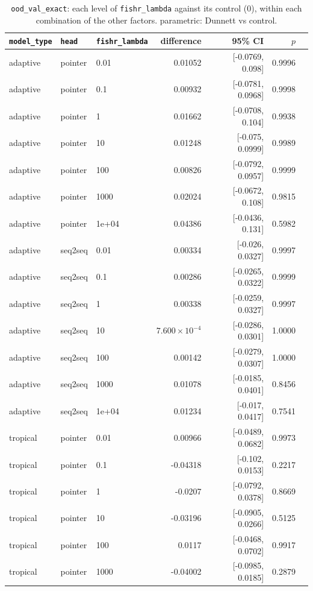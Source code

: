 \documentclass[10pt]{article}
\begin{document}
{\small
\begin{longtable}{lllrrrl}
\caption{\texttt{ood\_val\_exact}: each level of \texttt{fishr\_lambda} against its control (0), within each combination of the other factors. parametric: Dunnett vs control.}\label{tab:control-ood_val_exact}\\
\toprule
\texttt{model\_type} & \texttt{head} & \texttt{fishr\_lambda} & difference & 95\% CI & $p$ & \\
\midrule
\endhead
adaptive & pointer & 0.01 & 0.01052 & [-0.0769, 0.098] & 0.9996 & \\
adaptive & pointer & 0.1 & 0.00932 & [-0.0781, 0.0968] & 0.9998 & \\
adaptive & pointer & 1 & 0.01662 & [-0.0708, 0.104] & 0.9938 & \\
adaptive & pointer & 10 & 0.01248 & [-0.075, 0.0999] & 0.9989 & \\
adaptive & pointer & 100 & 0.00826 & [-0.0792, 0.0957] & 0.9999 & \\
adaptive & pointer & 1000 & 0.02024 & [-0.0672, 0.108] & 0.9815 & \\
adaptive & pointer & 1e+04 & 0.04386 & [-0.0436, 0.131] & 0.5982 & \\
adaptive & seq2seq & 0.01 & 0.00334 & [-0.026, 0.0327] & 0.9997 & \\
adaptive & seq2seq & 0.1 & 0.00286 & [-0.0265, 0.0322] & 0.9999 & \\
adaptive & seq2seq & 1 & 0.00338 & [-0.0259, 0.0327] & 0.9997 & \\
adaptive & seq2seq & 10 & $7.600\times10^{-4}$ & [-0.0286, 0.0301] & 1.0000 & \\
adaptive & seq2seq & 100 & 0.00142 & [-0.0279, 0.0307] & 1.0000 & \\
adaptive & seq2seq & 1000 & 0.01078 & [-0.0185, 0.0401] & 0.8456 & \\
adaptive & seq2seq & 1e+04 & 0.01234 & [-0.017, 0.0417] & 0.7541 & \\
tropical & pointer & 0.01 & 0.00966 & [-0.0489, 0.0682] & 0.9973 & \\
tropical & pointer & 0.1 & -0.04318 & [-0.102, 0.0153] & 0.2217 & \\
tropical & pointer & 1 & -0.0207 & [-0.0792, 0.0378] & 0.8669 & \\
tropical & pointer & 10 & -0.03196 & [-0.0905, 0.0266] & 0.5125 & \\
tropical & pointer & 100 & 0.0117 & [-0.0468, 0.0702] & 0.9917 & \\
tropical & pointer & 1000 & -0.04002 & [-0.0985, 0.0185] & 0.2879 & \\

\end{longtable}}
\end{document}
